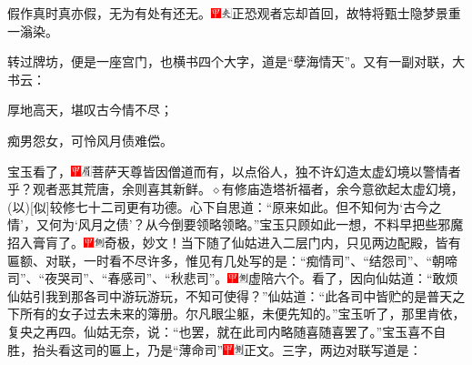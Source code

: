 假作真时真亦假，无为有处有还无。{{{\includegraphics[width=3mm]{../Images/00002}\includegraphics[width=3mm]{../Images/00012}\footnotesize \kaishu 正恐观者忘却首回，故特将甄士隐梦景重一}滃{染。}}}

转过牌坊，便是一座宫门，也横书四个大字，道是“孽海情天”。又有一副对联，大书云：

厚地高天，堪叹古今情不尽；

痴男怨女，可怜风月债难偿。

宝玉看了，{{\includegraphics[width=3mm]{../Images/00002}\includegraphics[width=3mm]{../Images/00010}\footnotesize \kaishu 菩萨天尊皆因僧道而有，以点俗人，独不许幻造太虚幻境以警情者乎？观者恶其荒唐，余则喜其新鲜。{$\diamond$}有修庙造塔祈福者，余今意欲起太虚幻境，{(以)}{[}似{]}较修七十二司更有功德。}}心下自思道：“原来如此。但不知何为‘古今之情’，又何为‘风月之债’？从今倒要领略领略。”宝玉只顾如此一想，不料早把些邪魔招入膏肓了。{\includegraphics[width=3mm]{../Images/00002}\includegraphics[width=3mm]{../Images/00011}\footnotesize \kaishu 奇极，妙文！}当下随了仙姑进入二层门内，只见两边配殿，皆有匾额、对联，一时看不尽许多，惟见有几处写的是：“痴情司”、“结怨司”、“朝啼司”、“夜哭司”、“春感司”、“秋悲司”。{\includegraphics[width=3mm]{../Images/00002}\includegraphics[width=3mm]{../Images/00011}\footnotesize \kaishu 虚陪六个。}看了，因向仙姑道：“敢烦仙姑引我到那各司中游玩游玩，不知可使得？”仙姑道：“此各司中皆贮的是普天之下所有的女子过去未来的簿册。尔凡眼尘躯，未便先知的。”宝玉听了，那里肯依，复央之再四。仙姑无奈，说：“也罢，就在此司内略随喜随喜罢了。”宝玉喜不自胜，抬头看这司的匾上，乃是“薄命司”{\includegraphics[width=3mm]{../Images/00002}\includegraphics[width=3mm]{../Images/00011}\footnotesize \kaishu 正文。}三字，两边对联写道是：

